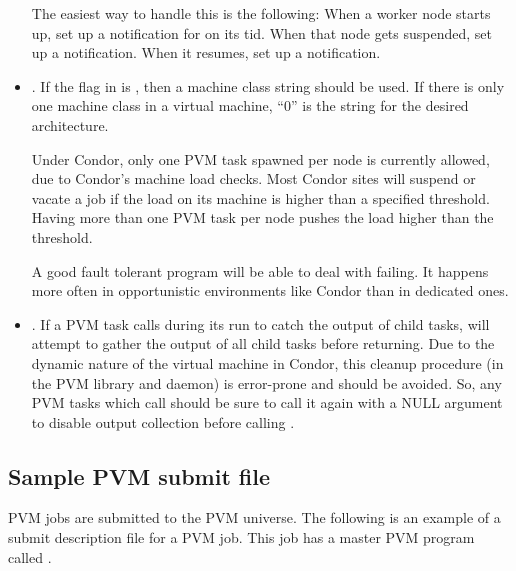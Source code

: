 \begin{itemize}
  The easiest way to handle this is the following:  When a worker
  node starts up, set up a notification for  on
  its tid.  When that node gets suspended, set up a 
  notification.  When it resumes, set up a 
  notification.


\item {}.  If the flag in  is 
  , then a machine class string 
  should be used.  If there is only one machine class
  in a virtual machine, ``0'' is the string for the desired architecture.

  Under Condor, only one
  PVM task spawned per node is currently allowed,
  due to Condor's machine load checks.
  Most Condor 
  sites will suspend or vacate
  a job if the load on its machine is higher than a specified
  threshold.
  Having more than one PVM task per node pushes the load
  higher than the threshold.

  A good fault tolerant program will be able to deal with
   failing.  It happens more often in opportunistic 
  environments like Condor than in dedicated ones.

\item {}.  If a PVM task calls 
  during its run to catch the output of child tasks,
   will attempt to gather the output of all child
  tasks before returning.  Due to the dynamic nature of the virtual
  machine in Condor, this cleanup procedure (in the PVM library and
  daemon) is error-prone and should be avoided.  So, any PVM tasks
  which call  should be sure to call it again
  with a NULL argument to disable output collection before calling
  .

\end{itemize}

\subsection{\label{sec:PVM-Submit}Sample PVM submit file}

PVM jobs are submitted to the PVM universe.
The following is an
example of a submit description file for a PVM job.  
This job has a master PVM program called .

